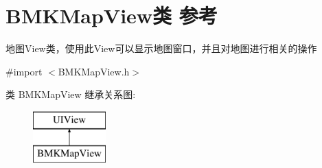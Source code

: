 \hypertarget{interface_b_m_k_map_view}{\section{B\+M\+K\+Map\+View类 参考}
\label{interface_b_m_k_map_view}
}


地图\+View类，使用此\+View可以显示地图窗口，并且对地图进行相关的操作  




{\ttfamily \#import $<$B\+M\+K\+Map\+View.\+h$>$}

类 B\+M\+K\+Map\+View 继承关系图\+:\begin{figure}[H]
\begin{center}
\leavevmode
\includegraphics[height=2.000000cm]{interface_b_m_k_map_view}
\end{center}
\end{figure}

